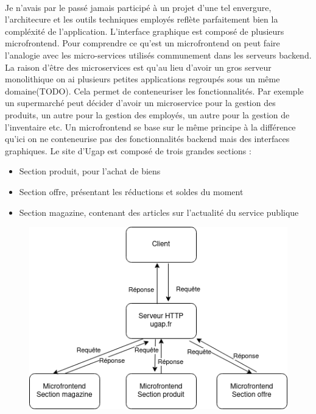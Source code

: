\documentclass[12pt]{article}
\begin{document}
\begin {sloppypar}
\paragraph{}
Je n'avais par le passé jamais participé à un projet d'une tel envergure, l'architecure et les outils 
techniques employés reflète parfaitement bien la compléxité de l'application. L'interface graphique 
est composé de plusieurs microfrontend. Pour comprendre ce qu'est un microfrontend on peut faire 
l'analogie avec les micro-services utilisés communement dans les serveurs backend. La raison d'être 
des microservices est qu'au lieu d'avoir un gros serveur monolithique on ai plusieurs petites applications 
regroupés sous un même domaine(TODO). Cela permet de conteneuriser les fonctionnalités. Par exemple 
un supermarché peut décider d'avoir un microservice pour la gestion des produits, un autre pour la 
gestion des employés, un autre pour la gestion de l'inventaire etc. Un microfrontend se base sur le même 
principe à la différence qu'ici on ne conteneurise pas des fonctionnalités backend mais des interfaces 
graphiques.
\newpage
Le site d'Ugap est composé de trois grandes sections : 
\begin{itemize}
  \item 
    Section produit, pour l'achat de biens
  \item 
    Section offre, présentant les réductions et soldes du moment
  \item 
    Section magazine, contenant des articles sur l'actualité du service publique
\end{itemize}
\begin{figure}[h]
  \includegraphics[width=\textwidth] {archi_ugap.png}

\end{figure}
\end{sloppypar}
\end{document}
